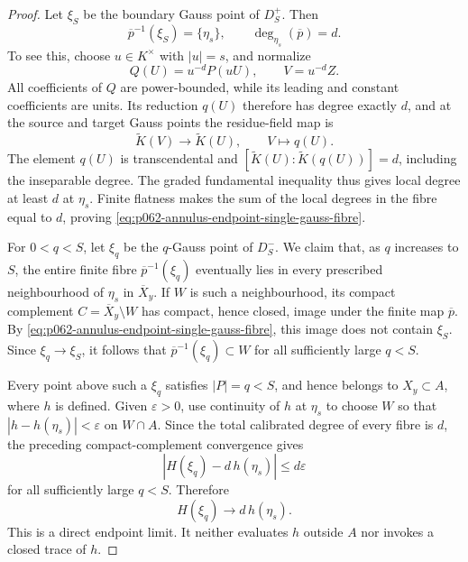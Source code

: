 \begin{proof}
Let \(\xi_S\) be the boundary Gauss point of \(D^+_S\).  Then
\begin{equation}\label{eq:p062-annulus-endpoint-single-gauss-fibre}
       \overline p^{-1}(\xi_S)=\{\eta_s\},
       \qquad \deg_{\eta_s}(\overline p)=d.
\end{equation}
To see this, choose \(u\in K^\times\) with \(|u|=s\), and normalize
\[
                Q(U)=u^{-d}P(uU),
                \qquad V=u^{-d}Z.
\]
All coefficients of \(Q\) are power-bounded, while its leading and constant
coefficients are units.  Its reduction \(q(U)\) therefore has degree exactly
\(d\), and at the source and target Gauss points the residue-field map is
\[
  \widetilde K(V)\longrightarrow\widetilde K(U),
                  \qquad V\longmapsto q(U).
\]
The element \(q(U)\) is transcendental and
\(
  [\widetilde K(U):\widetilde K(q(U))]=d
\), including the inseparable degree.  The graded fundamental inequality
thus gives local degree at least \(d\) at \(\eta_s\).  Finite flatness makes
the sum of the local degrees in the fibre equal to \(d\), proving
\eqref{eq:p062-annulus-endpoint-single-gauss-fibre}.

For \(0<q<S\), let \(\xi_q\) be the \(q\)-Gauss point of \(D^-_S\).  We
claim that, as \(q\) increases to \(S\), the entire finite fibre
\(\overline p^{-1}(\xi_q)\) eventually lies in every prescribed
neighbourhood of \(\eta_s\) in \(\overline X_y\).  If \(W\) is such a
neighbourhood, its compact complement
\(
                  C=\overline X_y\setminus W
\)
has compact, hence closed, image under the finite map \(\overline p\).
By \eqref{eq:p062-annulus-endpoint-single-gauss-fibre}, this image does not
contain \(\xi_S\).  Since \(\xi_q\to\xi_S\), it follows that
\(
                  \overline p^{-1}(\xi_q)\subset W
\)
for all sufficiently large \(q<S\).

Every point above such a \(\xi_q\) satisfies \(|P|=q<S\), and hence belongs
to \(X_y\subset A\), where \(h\) is defined.  Given \(\varepsilon>0\), use
continuity of \(h\) at \(\eta_s\) to choose \(W\) so that
\(
        |h-h(\eta_s)|<\varepsilon
\)
on \(W\cap A\).  Since the total calibrated degree of every fibre is \(d\),
the preceding compact-complement convergence gives
\[
             |H(\xi_q)-d\,h(\eta_s)|\leq d\varepsilon
\]
for all sufficiently large \(q<S\).  Therefore
\begin{equation}\label{eq:p062-annulus-endpoint-trace-limit}
                         H(\xi_q)\longrightarrow d\,h(\eta_s).
\end{equation}
This is a direct endpoint limit.  It neither evaluates \(h\) outside \(A\)
nor invokes a closed trace of \(h\).


\end{proof}
